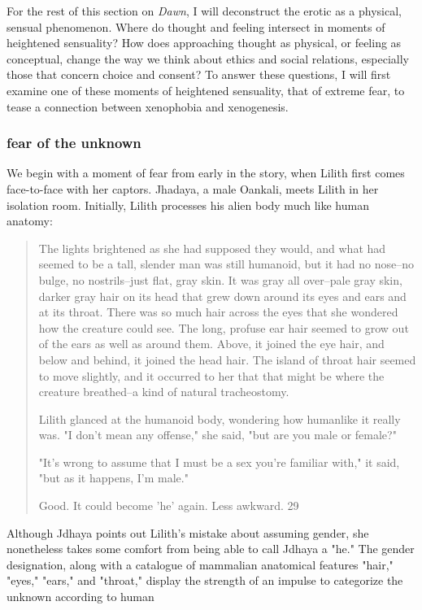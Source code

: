 \documentclass[11pt]{article}
\begin{document}
For the rest of this section on \emph{Dawn}, I will deconstruct the erotic
as a physical, sensual phenomenon. Where do thought and feeling
intersect in moments of heightened sensuality? How does approaching
thought as physical, or feeling as conceptual, change the way we think
about ethics and social relations, especially those that concern
choice and consent? To answer these questions, I will first examine
one of these moments of heightened sensuality, that of extreme fear,
to tease a connection between xenophobia and xenogenesis.

\subsubsection{fear of the unknown}
\label{sec:org591388f}
We begin with a moment of fear from early in the story, when Lilith
first comes face-to-face with her captors. Jhadaya, a male Oankali,
meets Lilith in her isolation room. Initially, Lilith processes his
alien body much like human anatomy:
\begin{quote}
The lights brightened as she had supposed they would, and what had
seemed to be a tall, slender man was still humanoid, but it had no
nose--no bulge, no nostrils--just flat, gray skin. It was gray all
over--pale gray skin, darker gray hair on its head that grew down
around its eyes and ears and at its throat. There was so much hair
across the eyes that she wondered how the creature could see. The
long, profuse ear hair seemed to grow out of the ears as well as
around them. Above, it joined the eye hair, and below and behind, it
joined the head hair. The island of throat hair seemed to move
slightly, and it occurred to her that that might be where the creature
breathed--a kind of natural tracheostomy.

Lilith glanced at the humanoid body, wondering how humanlike it really
was. "I don't mean any offense," she said, "but are you male or
female?"

"It's wrong to assume that I must be a sex you're familiar with," it
said, "but as it happens, I'm male."

Good. It could become 'he' again. Less awkward. 29
\end{quote}
Although Jdhaya points out Lilith's mistake about assuming gender, she
nonetheless takes some comfort from being able to call Jdhaya a "he."
The gender designation, along with a catalogue of mammalian anatomical
features "hair," "eyes," "ears," and "throat," display the strength of
an impulse to categorize the unknown according to human
\end{document}
